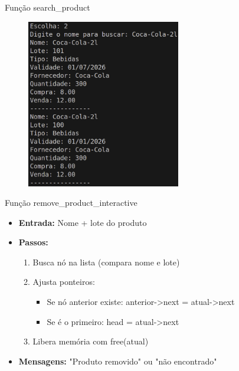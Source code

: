 \documentclass{beamer}
\begin{document}
\begin{frame}{Função search\_product}
    \begin{figure}
        \centering
        \includegraphics[width=0.6\textwidth]{img/busca.png}
    \end{figure}
\end{frame}

\begin{frame}{Função remove\_product\_interactive}
    \begin{itemize}
        \item \textbf{Entrada:} Nome + lote do produto
        \item \textbf{Passos:}
        \begin{enumerate}
            \item Busca nó na lista (compara nome e lote)
            \item Ajusta ponteiros:
            \begin{itemize}
                \item Se nó anterior existe: anterior-\textgreater next = atual-\textgreater next
                \item Se é o primeiro: head = atual-\textgreater next
            \end{itemize}
            \item Libera memória com free(atual)
        \end{enumerate}
        \item \textbf{Mensagens:} "Produto removido" ou "não encontrado"
    \end{itemize}
\end{frame}
\end{document}

